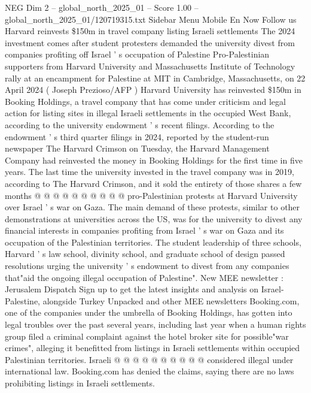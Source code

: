 \begin{textsample}{NEG Dim 2 – global\_north\_2025\_01 – Score 1.00 – global\_north\_2025\_01/120719315.txt}  \label{ex:f2_neg_049}
Sidebar Menu Mobile En Now Follow us Harvard reinvests \$150m in travel company listing Israeli settlements The 2024 investment comes after student protesters demanded the university divest from companies profiting off Israel ' s occupation of Palestine Pro-Palestinian supporters from Harvard University and Massachusetts Institute of Technology rally at an encampment for Palestine at MIT in Cambridge, Massachusetts, on 22 April 2024 ( Joseph Prezioso/AFP ) Harvard University has reinvested \$150m in Booking Holdings, a travel company that has come under criticism and legal action for listing sites in illegal Israeli settlements in the occupied West Bank, according to the university endowment ' s recent filings.
According to the endowment ' s third quarter filings in 2024, reported by the student-run newspaper The Harvard Crimson on Tuesday, the Harvard Management Company had reinvested the money in Booking Holdings for the first time in five years.
The last time the university invested in the travel company was in 2019, according to The Harvard Crimson, and it sold the entirety of those shares a few months @ @ @ @ @ @ @ @ @ @ pro-Palestinian protests at Harvard University over Israel ' s war on Gaza.
The main demand of these protests, similar to other demonstrations at universities across the US, was for the university to divest any financial interests in companies profiting from Israel ' s war on Gaza and its occupation of the Palestinian territories.
The student leadership of three schools, Harvard ' s law school, divinity school, and graduate school of design passed resolutions urging the university ' s endowment to divest from any companies that"aid the ongoing illegal occupation of Palestine".
New MEE newsletter : Jerusalem Dispatch Sign up to get the latest insights and analysis on Israel-Palestine, alongside Turkey Unpacked and other MEE newsletters Booking.com, one of the companies under the umbrella of Booking Holdings, has gotten into legal troubles over the past several years, including last year when a human rights group filed a criminal complaint against the hotel broker site for possible"war crimes", alleging it benefitted from listings in Israeli settlements within occupied Palestinian territories.
Israeli @ @ @ @ @ @ @ @ @ @ considered illegal under international law.
Booking.com has denied the claims, saying there are no laws prohibiting listings in Israeli settlements.

\end{textsample}
